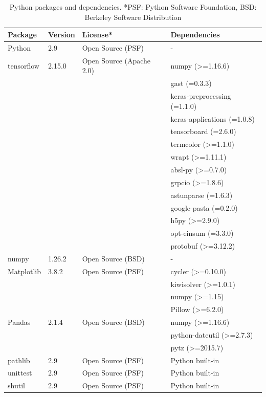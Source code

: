 \begin{table}[h]
	\centering
	\begin{tabular}{l|l|l|l}
		\hline
		\textbf{Package} & \textbf{Version} & \textbf{License*} & \textbf{Dependencies} \\
		\hline
		Python & 2.9 & Open Source (PSF) & - \\
		\hline
		tensorflow & 2.15.0 & Open Source (Apache 2.0) & numpy (>=1.16.6) \\
		& & & gast (=0.3.3) \\
		& & & keras-preprocessing (=1.1.0) \\
		& & & keras-applications (=1.0.8) \\
		& & & tensorboard (=2.6.0) \\
		& & & termcolor (>=1.1.0) \\
		& & & wrapt (>=1.11.1) \\
		& & & absl-py (>=0.7.0) \\
		& & & grpcio (>=1.8.6) \\
		& & & astunparse (=1.6.3) \\
		& & & google-pasta (=0.2.0) \\
		& & & h5py (>=2.9.0) \\
		& & & opt-einsum (=3.3.0) \\
		& & & protobuf (>=3.12.2) \\
		\hline
		numpy & 1.26.2 & Open Source (BSD) & - \\
		\hline
		Matplotlib & 3.8.2 & Open Source (PSF) & cycler (>=0.10.0) \\
		& & & kiwisolver (>=1.0.1) \\
		& & & numpy (>=1.15) \\
		& & & Pillow (>=6.2.0) \\
		\hline
		Pandas & 2.1.4 & Open Source (BSD) & numpy (>=1.16.6) \\
		& & & python-dateutil (>=2.7.3) \\
		& & & pytz (>=2015.7) \\
		\hline
		pathlib & 2.9 & Open Source (PSF) & Python built-in \\
		\hline
		unittest & 2.9 & Open Source (PSF) & Python built-in \\
		\hline
		shutil & 2.9 & Open Source (PSF) & Python built-in \\
		\hline
	\end{tabular}
	\caption{Python packages and dependencies. \footnotesize{*PSF: Python Software Foundation, BSD: Berkeley Software Distribution}}
	\label{tab:pythonPackages}
\end{table}

